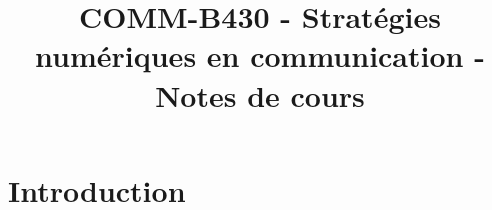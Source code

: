 

\title{COMM-B430 - Stratégies numériques en communication - Notes de cours}



\maketitle

\section{Introduction}


